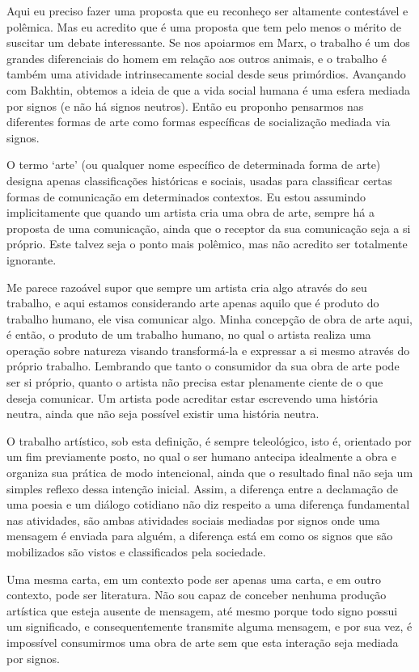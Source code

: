 Aqui eu preciso fazer uma proposta que eu reconheço ser altamente contestável e polêmica. Mas eu acredito que é uma proposta que tem pelo menos o mérito de suscitar um debate interessante. Se nos apoiarmos em Marx, o trabalho é um dos grandes diferenciais do homem em relação aos outros animais, e o trabalho é também uma atividade intrinsecamente social desde seus primórdios. Avançando com Bakhtin, obtemos a ideia de que a vida social humana é uma esfera mediada por signos (e não há signos neutros). Então eu proponho pensarmos nas diferentes formas de arte como formas específicas de socialização mediada via signos.

O termo ‘arte’ (ou qualquer nome específico de determinada forma de arte) designa apenas classificações históricas e sociais, usadas para classificar certas formas de comunicação em determinados contextos. Eu estou assumindo implicitamente que quando um artista cria uma obra de arte, sempre há a proposta de uma comunicação, ainda que o receptor da sua comunicação seja a si próprio. Este talvez seja o ponto mais polêmico, mas não acredito ser totalmente ignorante.

Me parece razoável supor que sempre um artista cria algo através do seu trabalho, e aqui estamos considerando arte apenas aquilo que é produto do trabalho humano, ele visa comunicar algo. Minha concepção de obra de arte aqui, é então, o produto de um trabalho humano, no qual o artista realiza uma operação sobre natureza visando transformá-la e expressar a si mesmo através do próprio trabalho. Lembrando que tanto o consumidor da sua obra de arte pode ser si próprio, quanto o artista não precisa estar plenamente ciente de o que deseja comunicar. Um artista pode acreditar estar escrevendo uma história neutra, ainda que não seja possível existir uma história neutra.

O trabalho artístico, sob esta definição, é sempre teleológico, isto é, orientado por um fim previamente posto, no qual o ser humano antecipa idealmente a obra e organiza sua prática de modo intencional, ainda que o resultado final não seja um simples reflexo dessa intenção inicial. Assim, a diferença entre a declamação de uma poesia e um diálogo cotidiano não diz respeito a uma diferença fundamental nas atividades, são ambas atividades sociais mediadas por signos onde uma mensagem é enviada para alguém, a diferença está em como os signos que são mobilizados são vistos e classificados pela sociedade.

Uma mesma carta, em um contexto pode ser apenas uma carta, e em outro contexto, pode ser literatura. Não sou capaz de conceber nenhuma produção artística que esteja ausente de mensagem, até mesmo porque todo signo possui um significado, e consequentemente transmite alguma mensagem, e por sua vez, é impossível consumirmos uma obra de arte sem que esta interação seja mediada por signos.

